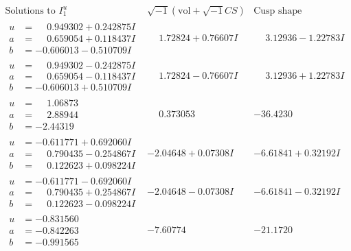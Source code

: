\documentclass[1p]{elsarticle_modified}
\theoremstyle{definition}
\newcommand{\I}{\sqrt{-1}}
\begin{document}
$$\begin{array}{c|c|c}  
\text{Solutions to }I^u_{1}& \I (\text{vol} + \sqrt{-1}CS) & \text{Cusp shape}\\
 \hline 
\begin{aligned}
u &= \phantom{-}0.949302 + 0.242875 I \\
a &= \phantom{-}0.659054 + 0.118437 I \\
b &= -0.606013 - 0.510709 I\end{aligned}
 & \phantom{-}1.72824 + 0.76607 I & \phantom{-}3.12936 - 1.22783 I \\ \hline\begin{aligned}
u &= \phantom{-}0.949302 - 0.242875 I \\
a &= \phantom{-}0.659054 - 0.118437 I \\
b &= -0.606013 + 0.510709 I\end{aligned}
 & \phantom{-}1.72824 - 0.76607 I & \phantom{-}3.12936 + 1.22783 I \\ \hline\begin{aligned}
u &= \phantom{-}1.06873\phantom{ +0.000000I} \\
a &= \phantom{-}2.88944\phantom{ +0.000000I} \\
b &= -2.44319\phantom{ +0.000000I}\end{aligned}
 & \phantom{-}0.373053\phantom{ +0.000000I} & -36.4230\phantom{ +0.000000I} \\ \hline\begin{aligned}
u &= -0.611771 + 0.692060 I \\
a &= \phantom{-}0.790435 - 0.254867 I \\
b &= \phantom{-}0.122623 + 0.098224 I\end{aligned}
 & -2.04648 + 0.07308 I & -6.61841 + 0.32192 I \\ \hline\begin{aligned}
u &= -0.611771 - 0.692060 I \\
a &= \phantom{-}0.790435 + 0.254867 I \\
b &= \phantom{-}0.122623 - 0.098224 I\end{aligned}
 & -2.04648 - 0.07308 I & -6.61841 - 0.32192 I \\ \hline\begin{aligned}
u &= -0.831560\phantom{ +0.000000I} \\
a &= -0.842263\phantom{ +0.000000I} \\
b &= -0.991565\phantom{ +0.000000I}\end{aligned}
 & -7.60774\phantom{ +0.000000I} & -21.1720\phantom{ +0.000000I} \\ \hline\begin{aligned}

\end{aligned}
\end{array}$$
\end{document}
